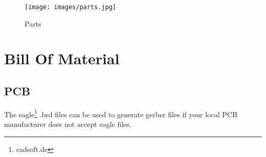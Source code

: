 \documentclass[12pt, a4paper]{report}
\begin{document}
\begin{figure}[h!tb]
\texttt{[image: images/parts.jpg]}
\caption{Parts}
\end{figure}

\section{Bill Of Material}

\subsection{PCB}
The eagle\footnote{cadsoft.de} .brd files can be used to generate gerber files if your local PCB manufacturer does not accept eagle files.

\end{document}
